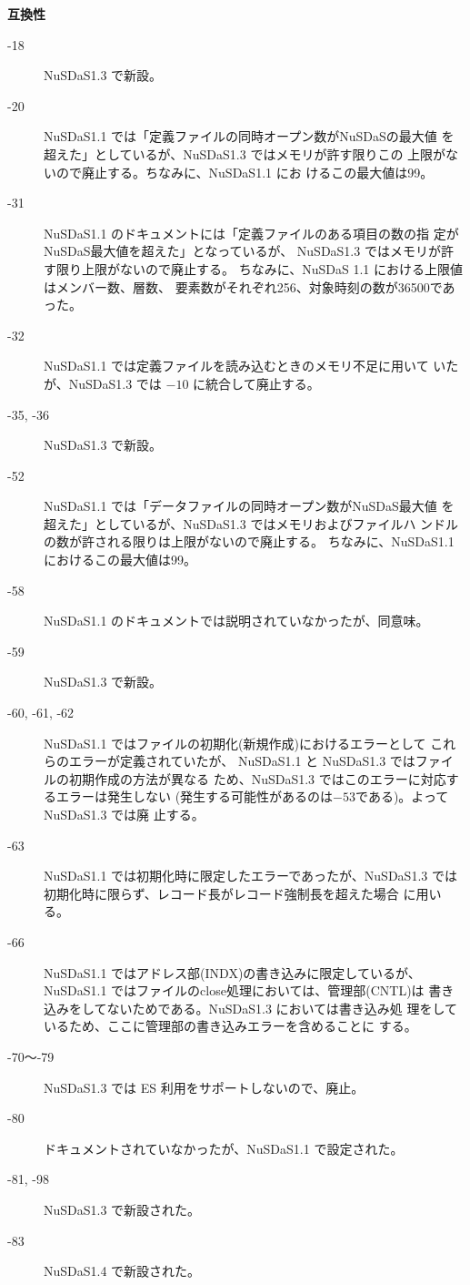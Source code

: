 \noindent
{\bf 互換性}
\begin{description}
 \item[-18]
	   NuSDaS1.3 で新設。
 \item[-20] 
	   NuSDaS1.1 では「定義ファイルの同時オープン数がNuSDaSの最大値
	   を超えた」としているが、NuSDaS1.3 ではメモリが許す限りこの
	   上限がないので廃止する。ちなみに、NuSDaS1.1 にお
	   けるこの最大値は99。
 \item[-31]
	    NuSDaS1.1 のドキュメントには「定義ファイルのある項目の数の指
	    定がNuSDaS最大値を超えた」となっているが、
	    NuSDaS1.3 ではメモリが許す限り上限がないので廃止する。
	    ちなみに、NuSDaS 1.1 における上限値はメンバー数、層数、
	    要素数がそれぞれ256、対象時刻の数が36500であった。
 \item[-32]
	    NuSDaS1.1 では定義ファイルを読み込むときのメモリ不足に用いて
	    いたが、NuSDaS1.3 では $-10$ に統合して廃止する。
 \item[-35, -36]
	    NuSDaS1.3 で新設。
 \item[-52]
	   NuSDaS1.1 では「データファイルの同時オープン数がNuSDaS最大値
	   を超えた」としているが、NuSDaS1.3 ではメモリおよびファイルハ
	   ンドルの数が許される限りは上限がないので廃止する。
	   ちなみに、NuSDaS1.1におけるこの最大値は99。
 \item[-58] 
	    NuSDaS1.1 のドキュメントでは説明されていなかったが、同意味。
 \item[-59]
	    NuSDaS1.3 で新設。
 \item[-60, -61, -62]
	    NuSDaS1.1 ではファイルの初期化(新規作成)におけるエラーとして
	    これらのエラーが定義されていたが、
	    NuSDaS1.1 と NuSDaS1.3 ではファイルの初期作成の方法が異なる
	    ため、NuSDaS1.3 ではこのエラーに対応するエラーは発生しない
	    (発生する可能性があるのは$-53$である)。よってNuSDaS1.3 では廃
	    止する。
 \item[-63]
	    NuSDaS1.1 では初期化時に限定したエラーであったが、NuSDaS1.3
	    では初期化時に限らず、レコード長がレコード強制長を超えた場合
	    に用いる。
 \item[-66]
	    NuSDaS1.1 ではアドレス部(INDX)の書き込みに限定しているが、
	    NuSDaS1.1 ではファイルのclose処理においては、管理部(CNTL)は
	    書き込みをしてないためである。NuSDaS1.3 においては書き込み処
	    理をしているため、ここに管理部の書き込みエラーを含めることに
	    する。
 \item[-70〜-79]
	    NuSDaS1.3 では ES 利用をサポートしないので、廃止。
 \item[-80]
	    ドキュメントされていなかったが、NuSDaS1.1 で設定された。
 \item[-81, -98]
	    NuSDaS1.3 で新設された。
 \item[-83]
	    NuSDaS1.4 で新設された。
\end{description}
\newpage
